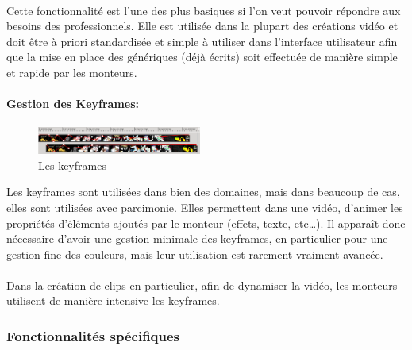 \paragraph{}
Cette fonctionnalité est l'une des plus basiques si
l'on veut pouvoir répondre aux besoins des professionnels. Elle est utilisée
dans la plupart des créations vidéo et doit être à priori standardisée et
simple à utiliser dans l'interface utilisateur afin que la mise en place
des génériques (déjà écrits) soit effectuée de manière simple et rapide
par les monteurs.

\paragraph{Gestion des Keyframes:}
\paragraph{}
\begin{figure}
    \begin{center}
      \includegraphics[width=0.48\textwidth]{images/keyframecurves}
    \end{center} \caption{Les keyframes} \label{Yes}
\end{figure}

Les keyframes sont utilisées dans bien des domaines, mais dans beaucoup de cas, elles sont
utilisées avec parcimonie. Elles permettent dans une vidéo, d'animer les propriétés
d'éléments ajoutés par le monteur (effets, texte, etc\ldots). Il
apparaît donc nécessaire d'avoir une gestion minimale des keyframes,
en particulier pour une gestion fine des couleurs, mais leur utilisation est
rarement vraiment avancée.

\paragraph{}
Dans la création de clips en particulier, afin de dynamiser la vidéo,
les monteurs utilisent de manière intensive les keyframes.

\subsubsection{Fonctionnalités spécifiques}

